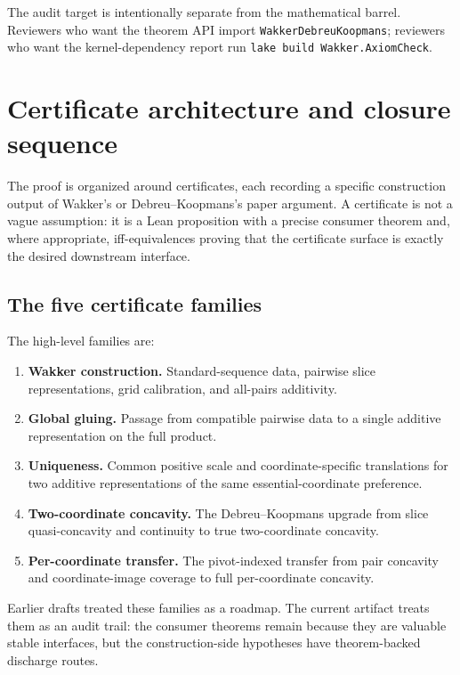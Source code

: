 \documentclass[11pt,english]{article}
\begin{document}
The audit target is intentionally separate from the mathematical barrel.  Reviewers who want the theorem API import \texttt{WakkerDebreuKoopmans}; reviewers who want the kernel-dependency report run \texttt{lake build Wakker.AxiomCheck}.

\section{Certificate architecture and closure sequence}
\label{sec:method}

The proof is organized around certificates, each recording a specific construction output of Wakker's or Debreu--Koopmans's paper argument.  A certificate is not a vague assumption: it is a Lean proposition with a precise consumer theorem and, where appropriate, iff-equivalences proving that the certificate surface is exactly the desired downstream interface.

\subsection{The five certificate families}

The high-level families are:
\begin{enumerate}[label=\textbf{C\arabic*.},leftmargin=*]
\item \textbf{Wakker construction.}  Standard-sequence data, pairwise slice representations, grid calibration, and all-pairs additivity.
\item \textbf{Global gluing.}  Passage from compatible pairwise data to a single additive representation on the full product.
\item \textbf{Uniqueness.}  Common positive scale and coordinate-specific translations for two additive representations of the same essential-coordinate preference.
\item \textbf{Two-coordinate concavity.}  The Debreu--Koopmans upgrade from slice quasi-concavity and continuity to true two-coordinate concavity.
\item \textbf{Per-coordinate transfer.}  The pivot-indexed transfer from pair concavity and coordinate-image coverage to full per-coordinate concavity.
\end{enumerate}

Earlier drafts treated these families as a roadmap.  The current artifact treats them as an audit trail: the consumer theorems remain because they are valuable stable interfaces, but the construction-side hypotheses have theorem-backed discharge routes.
\end{document}
